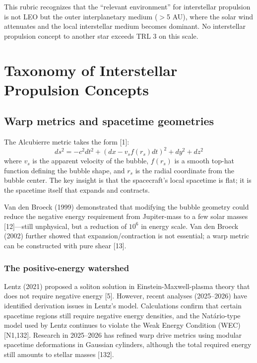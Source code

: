 \documentclass[11pt,a4paper,onecolumn]{article}
\begin{document}
This rubric recognizes that the ``relevant environment'' for interstellar propulsion is not LEO but the outer interplanetary medium ($>$5 AU), where the solar wind attenuates and the local interstellar medium becomes dominant. No interstellar propulsion concept to another star exceeds TRL 3 on this scale.

\section{Taxonomy of Interstellar Propulsion Concepts}

\subsection{Warp metrics and spacetime geometries}

The Alcubierre metric takes the form [1]:
%
\begin{equation}
ds^2 = -c^2 dt^2 + (dx - v_s f(r_s) dt)^2 + dy^2 + dz^2
\end{equation}
%
where $v_s$ is the apparent velocity of the bubble, $f(r_s)$ is a smooth top-hat function defining the bubble shape, and $r_s$ is the radial coordinate from the bubble center. The key insight is that the spacecraft's local spacetime is flat; it is the spacetime itself that expands and contracts.

Van den Broeck (1999) demonstrated that modifying the bubble geometry could reduce the negative energy requirement from Jupiter-mass to a few solar masses [12]---still unphysical, but a reduction of $10^6$ in energy scale. Van den Broeck (2002) further showed that expansion/contraction is not essential; a warp metric can be constructed with pure shear [13].

\subsubsection{The positive-energy watershed}

Lentz (2021) proposed a soliton solution in Einstein-Maxwell-plasma theory that does not require negative energy [5]. However, recent analyses (2025--2026) have identified derivation issues in Lentz's model. Calculations confirm that certain spacetime regions still require negative energy densities, and the Nat\'{a}rio-type model used by Lentz continues to violate the Weak Energy Condition (WEC) [N1,132]. Research in 2025--2026 has refined warp drive metrics using modular spacetime deformations in Gaussian cylinders, although the total required energy still amounts to stellar masses [132].
\end{document}
